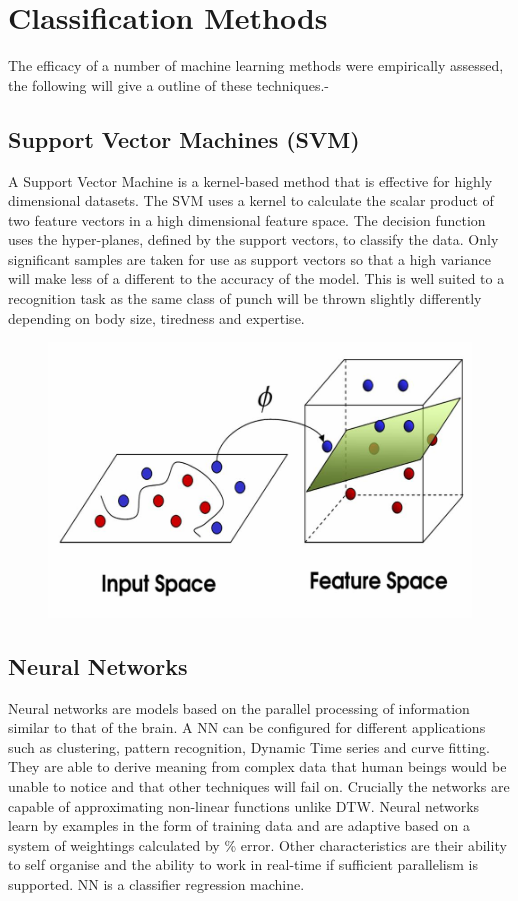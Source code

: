 \section{Classification Methods}
The efficacy of a number of machine learning methods were empirically assessed, the following will give a outline of these techniques.-

\subsection{Support Vector Machines (SVM)}
A Support Vector Machine is a kernel-based method that is effective for highly dimensional datasets. The SVM uses a kernel to calculate the scalar product of two feature vectors in a high dimensional feature space. The decision function uses the hyper-planes, defined by the support vectors,  to  classify  the  data.  Only  significant  samples  are  taken  for  use  as support vectors so that a high variance will make less of a different to the accuracy of the model. This is well suited to a recognition task as the same class of punch will be thrown slightly differently depending on body size, tiredness and expertise.

\begin{figure}[h]
    \centering
    \includegraphics[height=0.25\textheight]{fig02/svm.png}
\end{figure}

\subsection{Neural Networks} 
Neural networks are models based on the parallel processing of information similar to that of the brain. A NN can be configured for different applications such as clustering, pattern recognition, Dynamic Time series and curve fitting. They are able to derive meaning from complex data that human beings would be unable to notice and that other techniques will fail on. Crucially the networks are capable of approximating non-linear functions unlike DTW. Neural networks learn by examples in the form of training data and are adaptive based on a system of weightings calculated by \% error. Other characteristics are their ability to self organise and the ability to work in real-time if sufficient parallelism is supported. NN is a classifier regression machine.


